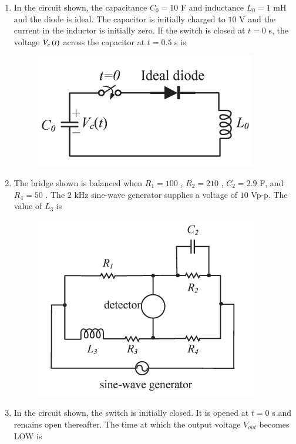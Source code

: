 \documentclass[journal,12pt,onecolumn]{IEEEtran}
\theoremstyle{remark}
\begin{document}
\begin{enumerate}
\item In the circuit shown, the capacitance $C_0 = 10$ \textmu F and inductance $L_0 = 1$ mH and the diode is ideal. The capacitor is initially charged to $10$ V and the current in the inductor is initially zero. If the switch is closed at $t = 0$ s, the voltage $V_c\left(t\right)$  across the capacitor at $t = 0.5$ s is \underline{\hspace{2cm}} 

\hfill{}
\begin{figure}[H]
\includegraphics[width = 0.5\columnwidth]{q62}
\caption*{}
\label{q62}
\end{figure}

\item The bridge shown is balanced when $R_1= 100$ \ohm, $R_2 = 210$ \ohm, $C_2 = 2.9$ \textmu F, and $R_4 = 50$ \ohm. The $2$ kHz sine-wave generator supplies a voltage of $10$ Vp-p. The value of $L_3$  is \underline{\hspace{2cm}} 

\hfill{}
\begin{figure}[H]
\includegraphics[width = 0.5\columnwidth]{q63}
\caption*{}
\label{q63}
\end{figure}

\item In the circuit shown, the switch is initially closed. It is opened at $t = 0$ s and remains open thereafter. The time  at which the output voltage $V_{out}$ becomes LOW is \underline{\hspace{2cm}} 


\end{enumerate}
\end{document}
